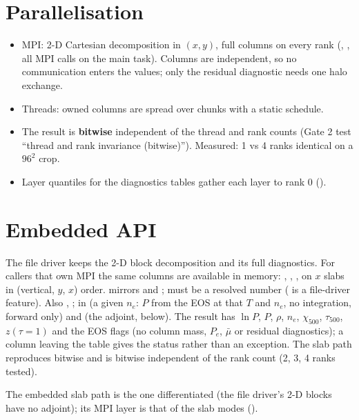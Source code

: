 \section{Parallelisation}
\begin{itemize}
\item MPI: 2-D Cartesian decomposition in $(x,y)$, full columns on every rank (, ,
all MPI calls on the main task). Columns are independent, so no communication enters the values; only the residual
diagnostic needs one halo exchange.
\item Threads: owned columns are spread over  chunks with a static schedule.
\item The result is \textbf{bitwise} independent of the thread and rank counts (Gate 2 test ``thread and rank invariance
(bitwise)''). Measured: 1 vs 4 ranks identical on a $96^2$ crop.
\item Layer quantiles for the diagnostics tables gather each layer to rank 0 ().
\end{itemize}

\section{Embedded API}
The file driver keeps the 2-D block decomposition and its full diagnostics. For callers that own MPI the same columns are
available in memory: , , , on $x$ slabs
in (vertical, $y$, $x$) order.  mirrors  and \code{[tau]};  must be a
resolved number ( is a file-driver feature). Also , ; in
  (a given $n_e$: $P$ from the EOS at that $T$ and $n_e$, no integration, forward only) and
 (the adjoint, below). The result has $\ln P$, $P$, $\rho$, $n_e$,
$\chi_{500}$, $\tau_{500}$, $z(\tau{=}1)$ and the EOS flags (no column mass, $P_e$, $\bar\mu$ or residual diagnostics); a
column leaving the table gives the status  rather than an exception. The slab path reproduces
 bitwise and is bitwise independent of the rank count (2, 3, 4 ranks tested).

\adjointcolumntrue

The embedded slab path is the one differentiated (the file driver's 2-D blocks have no adjoint); its MPI layer is that of the slab
modes ().

